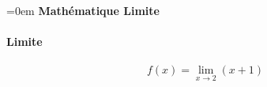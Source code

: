 \documentclass{article}
\begin{document}
\parindent=0em
\textbf{Mathématique Limite} \\ \\
\textbf{Limite} \\ \\
$$f(x)=\lim_{x \to 2} (x+1)$$ \\ \\
\end{document}
